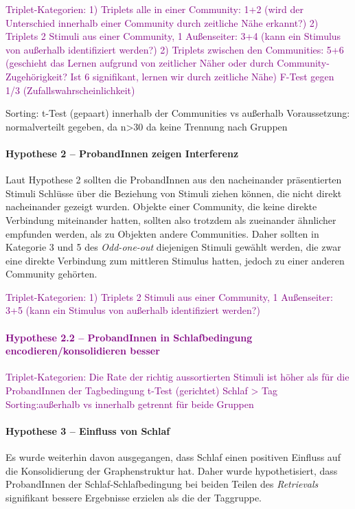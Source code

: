 \textcolor{purple}{Triplet-Kategorien:
1) Triplets alle in einer Community: 1+2 (wird der Unterschied innerhalb einer Community durch zeitliche Nähe erkannt?)
2) Triplets 2 Stimuli aus einer Community, 1 Außenseiter: 3+4 (kann ein Stimulus von außerhalb identifiziert werden?)
2) Triplets zwischen den Communities: 5+6 (geschieht das Lernen aufgrund von zeitlicher Näher oder durch Community-Zugehörigkeit? Ist 6 signifikant, lernen wir durch zeitliche Nähe)
F-Test gegen 1/3 (Zufallswahrscheinlichkeit)}

Sorting:
t-Test (gepaart) innerhalb der Communities vs außerhalb
Voraussetzung: normalverteilt gegeben, da n>30 da keine Trennung nach Gruppen

\paragraph{Hypothese 2 – ProbandInnen zeigen Interferenz}
Laut Hypothese 2 sollten die ProbandInnen aus den nacheinander präsentierten Stimuli Schlüsse über die Beziehung von Stimuli ziehen können, die nicht direkt nacheinander gezeigt wurden. Objekte einer Community, die keine direkte Verbindung miteinander hatten, sollten also trotzdem als zueinander ähnlicher empfunden werden, als zu Objekten andere Communities.
Daher sollten in Kategorie 3 und 5 des \textit{Odd-one-out} diejenigen Stimuli gewählt werden, die zwar eine direkte Verbindung zum mittleren Stimulus hatten, jedoch zu einer anderen Community gehörten.

\textcolor{purple}{Triplet-Kategorien:
1) Triplets 2 Stimuli aus einer Community, 1 Außenseiter: 3+5 (kann ein Stimulus von außerhalb identifiziert werden?) \paragraph{Hypothese 2.2 – ProbandInnen in Schlafbedingung encodieren/konsolidieren besser} Triplet-Kategorien: Die Rate der richtig aussortierten Stimuli ist höher als für die ProbandInnen der Tagbedingung t-Test (gerichtet) Schlaf > Tag Sorting:außerhalb vs innerhalb getrennt für beide Gruppen}

\paragraph{Hypothese 3 – Einfluss von Schlaf}
Es wurde weiterhin davon ausgegangen, dass Schlaf einen positiven Einfluss auf die Konsolidierung der Graphenstruktur hat. Daher wurde hypothetisiert, dass ProbandInnen der Schlaf-Schlafbedingung bei beiden Teilen des \textit{Retrievals} signifikant bessere Ergebnisse erzielen als die der Taggruppe.

